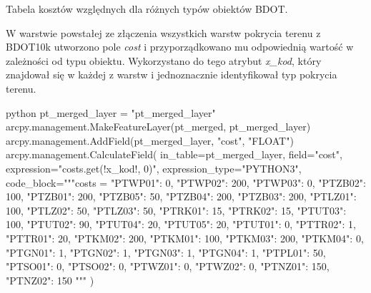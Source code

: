 \documentclass{article}
\begin{document}
\begin{table}[ht]
    \caption{Tabela kosztów względnych dla różnych typów obiektów BDOT.}
    \label{tab:bdot_costs}
\end{table}
\vspace{10pt}

W warstwie powstałej ze złączenia wszystkich warstw pokrycia terenu z BDOT10k utworzono pole \textit{cost} i przyporządkowano mu odpowiednią wartość w zależności od typu obiektu. Wykorzystano do tego atrybut \textit{x\_kod}, który znajdował się w każdej z warstw i jednoznacznie identyfikował typ pokrycia terenu.
\vspace{5pt}

\begin{mintedbox}{python}
pt_merged_layer = "pt_merged_layer"
arcpy.management.MakeFeatureLayer(pt_merged, pt_merged_layer)
arcpy.management.AddField(pt_merged_layer, "cost", "FLOAT")
arcpy.management.CalculateField(
    in_table=pt_merged_layer,
    field="cost",
    expression="costs.get(!x_kod!, 0)",
    expression_type="PYTHON3",
    code_block="""costs = {
    "PTWP01": 0, 
    "PTWP02": 200,
    "PTWP03": 0,
    "PTZB02": 100,
    "PTZB01": 200,
    "PTZB05": 50,
    "PTZB04": 200,
    "PTZB03": 200,
    "PTLZ01": 100,
    "PTLZ02": 50,
    "PTLZ03": 50,
    "PTRK01": 15,
    "PTRK02": 15,
    "PTUT03": 100,
    "PTUT02": 90,
    "PTUT04": 20,
    "PTUT05": 20,
    "PTUT01": 0,
    "PTTR02": 1,
    "PTTR01": 20,
    "PTKM02": 200,
    "PTKM01": 100,
    "PTKM03": 200,
    "PTKM04": 0,
    "PTGN01": 1,
    "PTGN02": 1,
    "PTGN03": 1,
    "PTGN04": 1,
    "PTPL01": 50,
    "PTSO01": 0,
    "PTSO02": 0,
    "PTWZ01": 0,
    "PTWZ02": 0,
    "PTNZ01": 150,
    "PTNZ02": 150
    }"""
)
\end{mintedbox}
\vspace{10pt}
\end{document}
